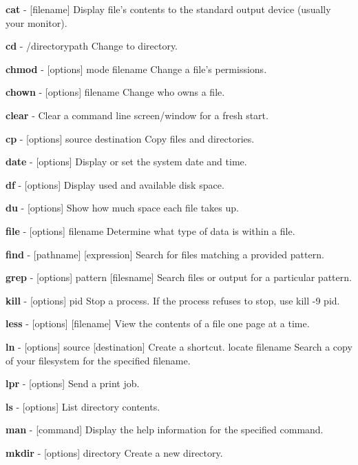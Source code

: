 {\bfseries{cat}} -\/ \mbox{[}filename\mbox{]} Display file’s contents to the standard output device (usually your monitor).

{\bfseries{cd}} -\/ /directorypath Change to directory.

{\bfseries{chmod}} -\/ \mbox{[}options\mbox{]} mode filename Change a file’s permissions.

{\bfseries{chown}} -\/ \mbox{[}options\mbox{]} filename Change who owns a file.

{\bfseries{clear}} -\/ Clear a command line screen/window for a fresh start.

{\bfseries{cp}} -\/ \mbox{[}options\mbox{]} source destination Copy files and directories.

{\bfseries{date}} -\/ \mbox{[}options\mbox{]} Display or set the system date and time.

{\bfseries{df}} -\/ \mbox{[}options\mbox{]} Display used and available disk space.

{\bfseries{du}} -\/ \mbox{[}options\mbox{]} Show how much space each file takes up.

{\bfseries{file}} -\/ \mbox{[}options\mbox{]} filename Determine what type of data is within a file.

{\bfseries{find}} -\/ \mbox{[}pathname\mbox{]} \mbox{[}expression\mbox{]} Search for files matching a provided pattern.

{\bfseries{grep}} -\/ \mbox{[}options\mbox{]} pattern \mbox{[}filesname\mbox{]} Search files or output for a particular pattern.

{\bfseries{kill}} -\/ \mbox{[}options\mbox{]} pid Stop a process. If the process refuses to stop, use kill -\/9 pid.

{\bfseries{less}} -\/ \mbox{[}options\mbox{]} \mbox{[}filename\mbox{]} View the contents of a file one page at a time.

{\bfseries{ln}} -\/ \mbox{[}options\mbox{]} source \mbox{[}destination\mbox{]} Create a shortcut. locate filename Search a copy of your filesystem for the specified filename.

{\bfseries{lpr}} -\/ \mbox{[}options\mbox{]} Send a print job.

{\bfseries{ls}} -\/ \mbox{[}options\mbox{]} List directory contents.

{\bfseries{man}} -\/ \mbox{[}command\mbox{]} Display the help information for the specified command.

{\bfseries{mkdir}} -\/ \mbox{[}options\mbox{]} directory Create a new directory.

